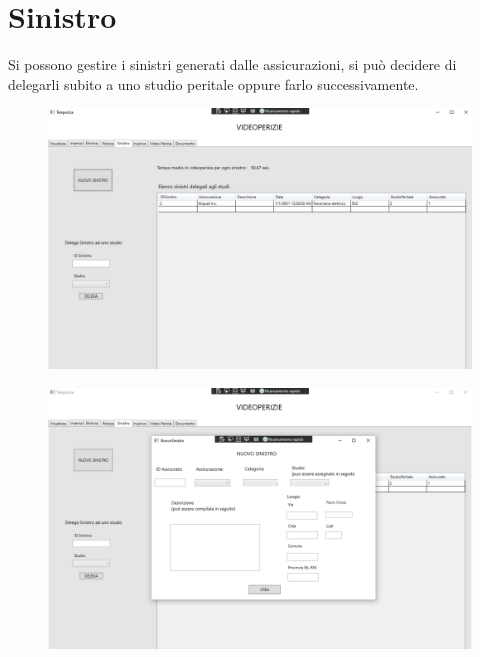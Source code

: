 \documentclass[a4paper,12pt]{report}
\begin{document}
\section{Sinistro}
Si possono gestire i sinistri generati dalle assicurazioni, si può decidere di delegarli subito a uno studio peritale oppure farlo successivamente.

\begin{figure}[ht]
    \begin{center}
        \centering
        \includegraphics[width=\textwidth]{img/Applicazione/Sinistro1.png}
    \end{center}
\end{figure}

\clearpage

\begin{figure}[ht]
    \begin{center}
        \centering
        \includegraphics[width=\textwidth]{img/Applicazione/Sinistro2.png}
    \end{center}
\end{figure}
\clearpage
\end{document}
